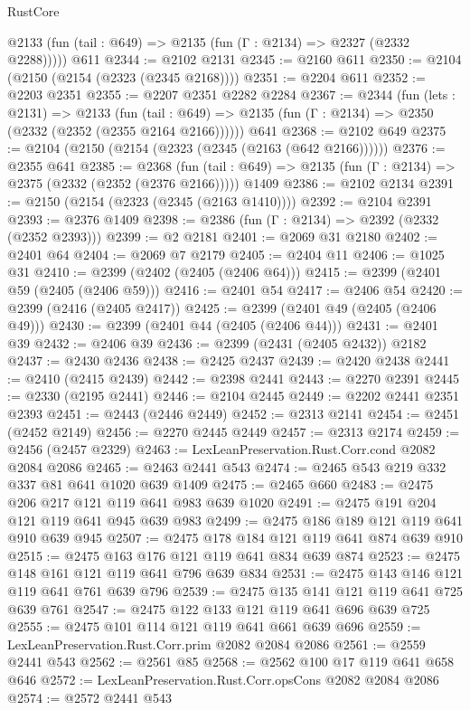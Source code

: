 \begin{lexlean}{RustCore}
\begin{coremodule}
      @2133 (fun (tail : @649) => @2135 (fun (Γ : @2134) => @2327 (@2332 @2288)))))
    @611
@2344 := @2102 @2131
@2345 := @2160 @611
@2350 := @2104 (@2150 (@2154 (@2323 (@2345 @2168))))
@2351 := @2204 @611
@2352 := @2203 @2351
@2355 := @2207 @2351 @2282 @2284
@2367 := @2344
    (fun (lets : @2131) =>
    @2133
      (fun (tail : @649) => @2135 (fun (Γ : @2134) => @2350 (@2332 (@2352 (@2355 @2164 @2166))))))
    @641
@2368 := @2102 @649
@2375 := @2104 (@2150 (@2154 (@2323 (@2345 (@2163 (@642 @2166))))))
@2376 := @2355 @641
@2385 := @2368
    (fun (tail : @649) => @2135 (fun (Γ : @2134) => @2375 (@2332 (@2352 (@2376 @2166)))))
    @1409
@2386 := @2102 @2134
@2391 := @2150 (@2154 (@2323 (@2345 (@2163 @1410))))
@2392 := @2104 @2391
@2393 := @2376 @1409
@2398 := @2386 (fun (Γ : @2134) => @2392 (@2332 (@2352 @2393)))
@2399 := @2 @2181
@2401 := @2069 @31 @2180
@2402 := @2401 @64
@2404 := @2069 @7 @2179
@2405 := @2404 @11
@2406 := @1025 @31
@2410 := @2399 (@2402 (@2405 (@2406 @64)))
@2415 := @2399 (@2401 @59 (@2405 (@2406 @59)))
@2416 := @2401 @54
@2417 := @2406 @54
@2420 := @2399 (@2416 (@2405 @2417))
@2425 := @2399 (@2401 @49 (@2405 (@2406 @49)))
@2430 := @2399 (@2401 @44 (@2405 (@2406 @44)))
@2431 := @2401 @39
@2432 := @2406 @39
@2436 := @2399 (@2431 (@2405 @2432)) @2182
@2437 := @2430 @2436
@2438 := @2425 @2437
@2439 := @2420 @2438
@2441 := @2410 (@2415 @2439)
@2442 := @2398 @2441
@2443 := @2270 @2391
@2445 := @2330 (@2195 @2441)
@2446 := @2104 @2445
@2449 := @2202 @2441 @2351 @2393
@2451 := @2443 (@2446 @2449)
@2452 := @2313 @2141
@2454 := @2451 (@2452 @2149)
@2456 := @2270 @2445 @2449
@2457 := @2313 @2174
@2459 := @2456 (@2457 @2329)
@2463 := LexLeanPreservation.Rust.Corr.cond @2082 @2084 @2086
@2465 := @2463 @2441 @543
@2474 := @2465 @543 @219 @332 @337 @81 @641 @1020 @639 @1409
@2475 := @2465 @660
@2483 := @2475 @206 @217 @121 @119 @641 @983 @639 @1020
@2491 := @2475 @191 @204 @121 @119 @641 @945 @639 @983
@2499 := @2475 @186 @189 @121 @119 @641 @910 @639 @945
@2507 := @2475 @178 @184 @121 @119 @641 @874 @639 @910
@2515 := @2475 @163 @176 @121 @119 @641 @834 @639 @874
@2523 := @2475 @148 @161 @121 @119 @641 @796 @639 @834
@2531 := @2475 @143 @146 @121 @119 @641 @761 @639 @796
@2539 := @2475 @135 @141 @121 @119 @641 @725 @639 @761
@2547 := @2475 @122 @133 @121 @119 @641 @696 @639 @725
@2555 := @2475 @101 @114 @121 @119 @641 @661 @639 @696
@2559 := LexLeanPreservation.Rust.Corr.prim @2082 @2084 @2086
@2561 := @2559 @2441 @543
@2562 := @2561 @85
@2568 := @2562 @100 @17 @119 @641 @658 @646
@2572 := LexLeanPreservation.Rust.Corr.opsCons @2082 @2084 @2086
@2574 := @2572 @2441 @543

\end{coremodule}
\end{lexlean}
